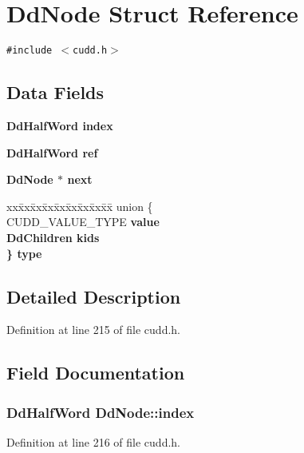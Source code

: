 \section{Dd\-Node Struct Reference}
\label{structDdNode}
{\tt \#include $<$cudd.h$>$}

\subsection*{Data Fields}
\begin{CompactItemize}
\item 
\bf{Dd\-Half\-Word} \bf{index}
\item 
\bf{Dd\-Half\-Word} \bf{ref}
\item 
\bf{Dd\-Node} $\ast$ \bf{next}
\item 
\begin{tabbing}
xx\=xx\=xx\=xx\=xx\=xx\=xx\=xx\=xx\=\kill
union \{\\
\>CUDD\_VALUE\_TYPE \bf{value}\\
\>\bf{DdChildren} \bf{kids}\\
\} \bf{type}\\

\end{tabbing}\end{CompactItemize}


\subsection{Detailed Description}




Definition at line 215 of file cudd.h.

\subsection{Field Documentation}
\subsubsection{\setlength{\rightskip}{0pt plus 5cm}\bf{Dd\-Half\-Word} \bf{Dd\-Node::index}}\label{structDdNode_bbd39b25b9abe4b4d53cd267a4103bda}




Definition at line 216 of file cudd.h.


